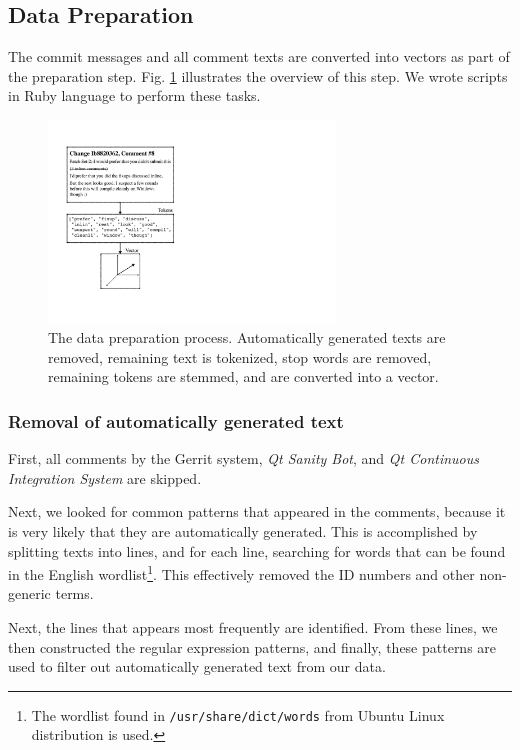 \documentclass[conference]{IEEEtran}
\begin{document}
\subsection{Data Preparation}

The commit messages and all comment texts are converted into vectors as part of the preparation step.
Fig. \ref{fig:preprocess} illustrates the overview of this step.
We wrote scripts in Ruby language to perform these tasks.

\begin{figure}[h]
\centering
\includegraphics[width=3in]{preprocess}
\caption{The data preparation process.
Automatically generated texts are removed, remaining text is tokenized, stop words are removed, remaining tokens are stemmed,
and are converted into a vector.}
\label{fig:preprocess}
\end{figure}

\subsubsection{Removal of automatically generated text}

First, all comments by the Gerrit system, \emph{Qt Sanity Bot}, and \emph{Qt Continuous Integration System} are skipped.

Next, we looked for common patterns that appeared in the comments, because it is very likely that they are automatically generated.
This is accomplished by splitting texts into lines, and for each line, searching for words that can be found in the English wordlist\footnote{The wordlist found in \texttt{/usr/share/dict/words} from Ubuntu Linux distribution is used.}.
This effectively removed the ID numbers and other non-generic terms.

Next, the lines that appears most frequently are identified.
From these lines, we then constructed the regular expression patterns,
and finally, these patterns are used to filter out automatically generated text from our data.
\end{document}
